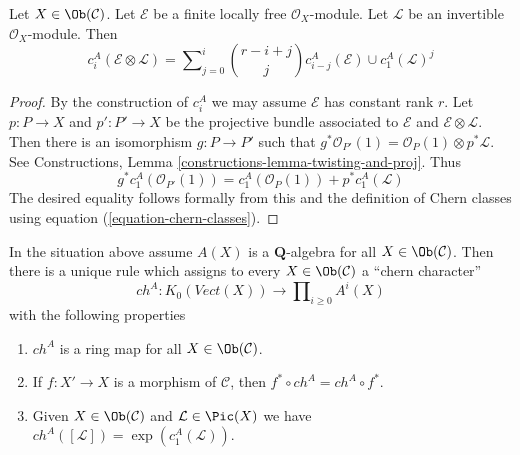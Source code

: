 \begin{lemma}
\label{lemma-chern-classes-E-tensor-L}
Let $X \in \Ob(\mathcal{C})$. Let $\mathcal{E}$ be a finite locally free
$\mathcal{O}_X$-module. Let $\mathcal{L}$ be an invertible
$\mathcal{O}_X$-module. Then
$$
c^A_i({\mathcal E} \otimes {\mathcal L})
=
\sum\nolimits_{j = 0}^i
\binom{r - i + j}{j} c^A_{i - j}({\mathcal E}) \cup c^A_1({\mathcal L})^j
$$
\end{lemma}

\begin{proof}
By the construction of $c^A_i$ we may assume $\mathcal{E}$ has
constant rank $r$. Let $p : P \to X$ and $p' : P' \to X$ be the
projective bundle associated to $\mathcal{E}$ and
$\mathcal{E} \otimes \mathcal{L}$.
Then there is an isomorphism $g : P \to P'$ such that
$g^*\mathcal{O}_{P'}(1) = \mathcal{O}_P(1) \otimes p^*\mathcal{L}$.
See Constructions, Lemma \ref{constructions-lemma-twisting-and-proj}.
Thus
$$
g^*c_1^A(\mathcal{O}_{P'}(1)) =
c_1^A(\mathcal{O}_P(1)) + p^*c_1^A(\mathcal{L})
$$
The desired equality follows formally from this and the definition
of Chern classes using equation (\ref{equation-chern-classes}).
\end{proof}

\begin{proposition}
\label{proposition-chern-character}
In the situation above assume $A(X)$ is a $\mathbf{Q}$-algebra for all
$X \in \Ob(\mathcal{C})$. Then there is a unique rule which assigns to
every $X \in \Ob(\mathcal{C})$ a ``chern character''
$$
ch^A : K_0(\textit{Vect}(X)) \longrightarrow
\prod\nolimits_{i \geq 0} A^i(X)
$$
with the following properties
\begin{enumerate}
\item $ch^A$ is a ring map for all $X \in \Ob(\mathcal{C})$.
\item If $f : X' \to X$ is a morphism of $\mathcal{C}$, then
$f^* \circ ch^A =  ch^A \circ f^*$.
\item Given $X \in \Ob(\mathcal{C})$ and $\mathcal{L} \in \Pic(X)$
we have $ch^A([\mathcal{L}]) = \exp(c_1^A(\mathcal{L}))$.
\end{enumerate}
\end{proposition}

